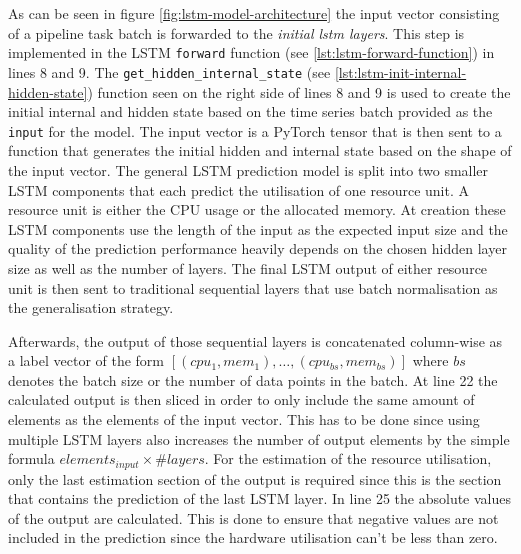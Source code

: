     As can be seen in figure \ref{fig:lstm-model-architecture} the input vector consisting of a pipeline task batch is forwarded to the \emph{initial lstm layers}. This step is implemented in the LSTM \texttt{forward} function (see \ref{lst:lstm-forward-function}) in lines 8 and 9. The \texttt{get\_hidden\_internal\_state} (see \ref{lst:lstm-init-internal-hidden-state}) function seen on the right side of lines 8 and 9 is used to create the initial internal and hidden state based on the time series batch provided as the \texttt{input} for the model. The input vector is a PyTorch tensor that is then sent to a function that generates the initial hidden and internal state based on the shape of the input vector.
    The general LSTM prediction model is split into two smaller LSTM components that each predict the utilisation of one resource unit. A resource unit is either the CPU usage or the allocated memory. At creation these LSTM components use the length of the input as the expected input size and the quality of the prediction performance heavily depends on the chosen hidden layer size as well as the number of  layers.
    The final LSTM output of either resource unit is then sent to traditional sequential layers that use batch normalisation as the generalisation strategy.
    
    Afterwards, the output of those sequential layers is concatenated column-wise as a label vector of the form $\left[(cpu_1, mem_1), \dots, (cpu_{bs}, mem_{bs})\right]$ where $bs$ denotes the batch size or the number of data points in the batch.
    At line 22 the calculated output is then sliced in order to only include the same amount of elements as the elements of the input vector. This has to be done since using multiple LSTM layers also increases the number of output elements by the simple formula $elements_{input} \times \#layers$. For the estimation of the resource utilisation, only the last estimation section of the output is required since this is the section that contains the prediction of the last LSTM layer.
    In line 25 the absolute values of the output are calculated. This is done to ensure that negative values are not included in the prediction since the hardware utilisation can't be less than zero.

    

    


